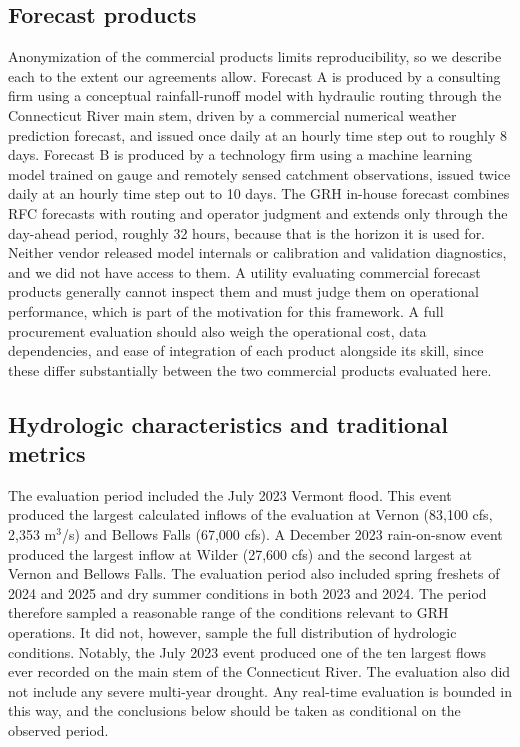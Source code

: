 \documentclass[MLA]{USG} %
\begin{document}
\subsection{Forecast products}\label{sec:products}

Anonymization of the commercial products limits reproducibility, so we describe each to the extent our agreements allow. Forecast A is produced by a consulting firm using a conceptual rainfall-runoff model with hydraulic routing through the Connecticut River main stem, driven by a commercial numerical weather prediction forecast, and issued once daily at an hourly time step out to roughly 8 days. Forecast B is produced by a technology firm using a machine learning model trained on gauge and remotely sensed catchment observations, issued twice daily at an hourly time step out to 10 days. The GRH in-house forecast combines RFC forecasts with routing and operator judgment and extends only through the day-ahead period, roughly 32 hours, because that is the horizon it is used for. Neither vendor released model internals or calibration and validation diagnostics, and we did not have access to them. A utility evaluating commercial forecast products generally cannot inspect them and must judge them on operational performance, which is part of the motivation for this framework. A full procurement evaluation should also weigh the operational cost, data dependencies, and ease of integration of each product alongside its skill, since these differ substantially between the two commercial products evaluated here.

\subsection{Hydrologic characteristics and traditional metrics}\label{sec:period}

The evaluation period included the July 2023 Vermont flood. This event produced the largest calculated inflows of the evaluation at Vernon (83,100 cfs, 2,353 m$^3$/s) and Bellows Falls (67,000 cfs). A December 2023 rain-on-snow event produced the largest inflow at Wilder (27,600 cfs) and the second largest at Vernon and Bellows Falls. The evaluation period also included spring freshets of 2024 and 2025 and dry summer conditions in both 2023 and 2024. The period therefore sampled a reasonable range of the conditions relevant to GRH operations. It did not, however, sample the full distribution of hydrologic conditions. Notably, the July 2023 event produced one of the ten largest flows ever recorded on the main stem of the Connecticut River. The evaluation also did not include any severe multi-year drought. Any real-time evaluation is bounded in this way, and the conclusions below should be taken as conditional on the observed period. 
\end{document}
